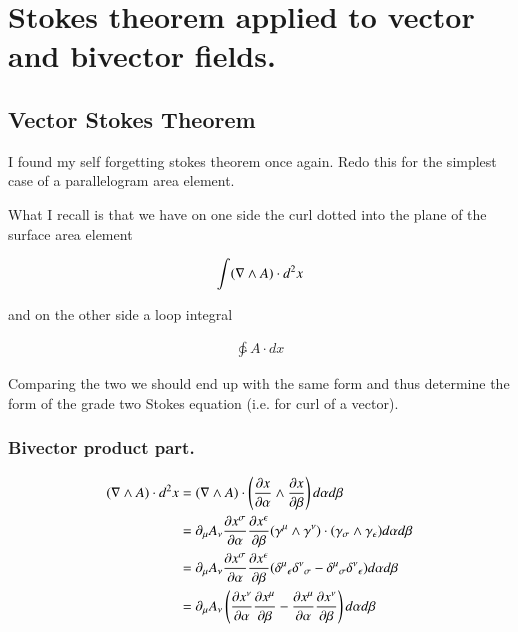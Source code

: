 

\usepackage{txfonts}

\chapter{Stokes theorem applied to vector and bivector fields.}
\label{chap:stokesGradeTwo}
\date{July 17, 2009}

\beginArtWithToc

\section{Vector Stokes Theorem}

I found my self forgetting stokes theorem once again.  Redo this for the simplest case of a parallelogram area element.

What I recall is that we have on one side the curl dotted into the plane of the surface area element

\begin{align}
\int ( \nabla \wedge A ) \cdot d^2 x
\end{align}

and on the other side a loop integral

\begin{align}
\ointctrclockwise A \cdot dx
\end{align}

Comparing the two we should end up with the same form and thus determine the form of the grade two Stokes equation (i.e. for curl of a vector).

\subsection{Bivector product part.}

\begin{align*}
( \nabla \wedge A ) \cdot d^2 x 
&=
( \nabla \wedge A ) \cdot \left(\frac{\partial {x}}{\partial {\alpha}} \wedge \frac{\partial {x}}{\partial {\beta}}\right) 
d\alpha d\beta \\
&=
\partial_\mu A_\nu \frac{\partial {x^\sigma}}{\partial {\alpha}} \frac{\partial {x^\epsilon}}{\partial {\beta}} (\gamma^\mu \wedge \gamma^\nu) \cdot (\gamma_\sigma \wedge \gamma_\epsilon) 
d\alpha d\beta \\
&=
\partial_\mu A_\nu \frac{\partial {x^\sigma}}{\partial {\alpha}} \frac{\partial {x^\epsilon}}{\partial {\beta}} ( {\delta^\mu}_\epsilon {\delta^\nu}_\sigma - {\delta^\mu}_\sigma {\delta^\nu}_\epsilon ) 
d\alpha d\beta \\
&=
\partial_\mu A_\nu \left( \frac{\partial {x^\nu}}{\partial {\alpha}} \frac{\partial {x^\mu}}{\partial {\beta}} - \frac{\partial {x^\mu}}{\partial {\alpha}} \frac{\partial {x^\nu}}{\partial {\beta}} \right) 
d\alpha d\beta \\
\end{align*}

